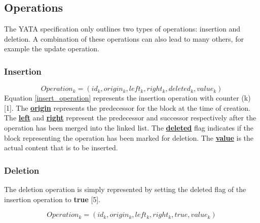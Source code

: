 \documentclass[9pt, titlepage]{article}
\begin{document}
  \subsection{Operations}
  The YATA specification only outlines two types of operations: insertion and deletion.
  A combination of these operations can also lead to many others, for example the update operation.

  \subsubsection{Insertion}
  \begin{equation} \label{insert_operation}
    Operation_{k} = (id_{k}, origin_{k}, left_{k}, right_{k}, deleted_{k}, value_{k})
  \end{equation}
  Equation \ref{insert_operation} represents the insertion operation with counter (k) [1].
  The \underline{\textbf{origin}} represents the predecessor for the block at the time of creation.
  The \underline{\textbf{left}} and \underline{\textbf{right}} represent the predecessor and successor respectively after the operation has been merged into the linked list.
  The \underline{\textbf{deleted}} flag indicates if the block representing the operation has been marked for deletion.
  The \underline{\textbf{value}} is the actual content that is to be inserted.
  
  \subsubsection{Deletion}
  The deletion operation is simply represented by setting the deleted flag of the insertion operation to \textbf{true} [5].
  
  \begin{equation} \label{deletion_operation}
    Operation_{k} = (id_{k}, origin_{k}, left_{k}, right_{k}, true, value_{k})
  \end{equation}
\end{document}
